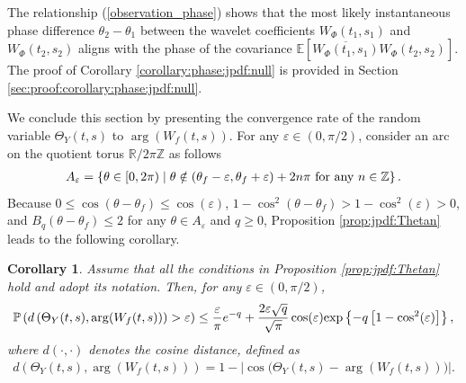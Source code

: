 \documentclass{amsart}
\newtheorem{Corollary}{Corollary}
\begin{document}
The relationship (\ref{observation_phase}) shows
that the most likely instantaneous phase difference $\theta_{2} - \theta_{1}$
between the wavelet coefficients
$W_{\Phi}(t_{1},s_{1})$ and $W_{\Phi}(t_{2},s_{2})$ aligns with the phase of the covariance
$\mathbb{E}[\overline{W_{\Phi}(t_{1},s_{1})}W_{\Phi}(t_{2},s_{2})]$.
The proof of  Corollary \ref{corollary:phase:jpdf:null} is provided in Section \ref{sec:proof:corollary:phase:jpdf:null}.




We conclude this section by presenting the convergence rate of the random variable $\Theta_{Y}(t,s)$ to $\arg(W_{f}(t,s)).$
For any $\varepsilon\in (0,\pi/2)$,
consider an arc on the quotient torus $\mathbb{R}/2\pi \mathbb{Z}$ as follows
\begin{align*}
A_{\varepsilon} = \left\{\theta\in [0,2\pi) \mid \theta\notin (\theta _{f}-\varepsilon,\theta_{f}+\varepsilon)+2n\pi\ \textup{for any}\ n\in \mathbb{Z}\right\}.
\end{align*}
Because $0\leq\cos(\theta-\theta_{f})\leq \cos(\varepsilon)$,
$1-\cos^{2}(\theta-\theta_{f})>1-\cos^{2}(\varepsilon)>0$,
and
$
B_{q}(\theta-\theta_{f})\leq 2
$
for any $\theta\in A_{\varepsilon}$ and $q\geq 0$,
Proposition \ref{prop:jpdf:Thetan} leads to the following corollary.


\begin{Corollary}\label{corollary:phase:expo}
Assume that all the conditions in Proposition \ref{prop:jpdf:Thetan} hold and adopt its notation. Then, for any $\varepsilon\in (0,\pi/2)$,
\begin{align}\notag
\mathbb{P}\left(d\left(\Theta_{Y}(t,s),\arg(W_{f}(t,s))\right)>\varepsilon\right)
\leq \frac{\varepsilon}{\pi }e^{-q}
+\frac{2\varepsilon \sqrt{q}}{\sqrt{\pi}}\cos(\varepsilon)\textup{exp}\left\{-q\left[1-\cos^{2}(\varepsilon)\right]\right\},
\end{align}
where $d(\cdot,\cdot)$ denotes the cosine distance, defined as
\begin{align*}
d\left(\Theta_{Y}(t,s),\arg(W_{f}(t,s))\right)
= 1-\left|\cos\big(\Theta_{Y}(t,s)-\arg(W_{f}(t,s))\big)\right|.
\end{align*}
\end{Corollary}
\end{document}
